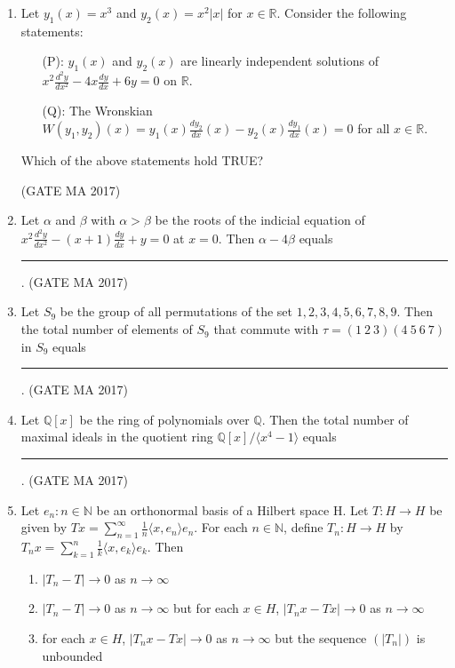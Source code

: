 \documentclass[journal,12pt,onecolumn]{IEEEtran}
\theoremstyle{remark}
\begin{document}
\begin{enumerate}
\item
Let $y_1(x) = x^3$ and $y_2(x) = x^2|x|$ for $x \in \mathbb{R}$. Consider the following statements:
\begin{itemize}
\item[(P):] $y_1(x)$ and $y_2(x)$ are linearly independent solutions of $x^2\frac{d^2y}{dx^2} - 4x\frac{dy}{dx} + 6y = 0$ on $\mathbb{R}$.
\item[(Q):] The Wronskian $W(y_1, y_2)(x) = y_1(x)\frac{dy_2}{dx}(x) - y_2(x)\frac{dy_1}{dx}(x) = 0$ for all $x \in \mathbb{R}$.
\end{itemize}
Which of the above statements hold TRUE?
\begin{enumerate}
\end{enumerate}
\hfill (GATE MA 2017)
\item
Let $\alpha$ and $\beta$ with $\alpha > \beta$ be the roots of the indicial equation of $x^2 \frac{d^2y}{dx^2} - (x+1) \frac{dy}{dx} + y = 0$ at $x=0$. Then $\alpha - 4\beta$ equals \rule{1.5cm}{0.4pt}.
\hfill (GATE MA 2017)
\item
Let $S_9$ be the group of all permutations of the set ${1, 2, 3, 4, 5, 6, 7, 8, 9}$. Then the total number of elements of $S_9$ that commute with $\tau = (1 \ 2 \ 3)(4 \ 5 \ 6 \ 7)$ in $S_9$ equals \rule{1.5cm}{0.4pt}.
\hfill (GATE MA 2017)
\item
Let $\mathbb{Q}[x]$ be the ring of polynomials over $\mathbb{Q}$. Then the total number of maximal ideals in the quotient ring $\mathbb{Q}[x]/\langle x^4 - 1 \rangle$ equals \rule{1.5cm}{0.4pt}.
\hfill (GATE MA 2017)
\item
Let ${e_n : n \in \mathbb{N}}$ be an orthonormal basis of a Hilbert space H. Let $T: H \to H$ be given by $Tx = \sum_{n=1}^\infty \frac{1}{n} \langle x, e_n \rangle e_n$. For each $n \in \mathbb{N}$, define $T_n: H \to H$ by $T_n x = \sum_{k=1}^n \frac{1}{k} \langle x, e_k \rangle e_k$. Then
\begin{enumerate}
\item $|T_n - T| \to 0$ as $n \to \infty$
\item $|T_n - T| \to 0$ as $n \to \infty$ but for each $x \in H$, $|T_n x - Tx| \to 0$ as $n \to \infty$
\item for each $x \in H$, $|T_n x - Tx| \to 0$ as $n \to \infty$ but the sequence $(|T_n|)$ is unbounded

\end{enumerate}
\end{enumerate}
\end{document}
